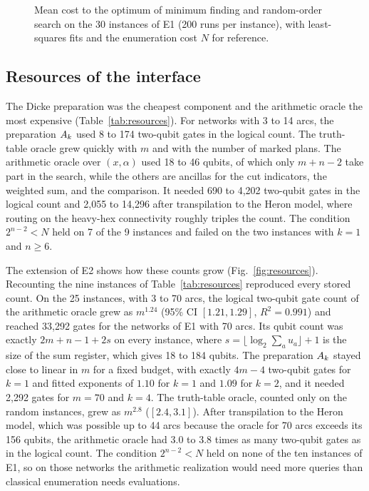 \begin{figure}[t]
\centering

\caption{Mean cost to the optimum of minimum finding and random-order search on the 30 instances of E1 (200 runs per instance), with least-squares fits and the enumeration cost $N$ for reference.}\label{fig:scaling}
\end{figure}

\subsection{Resources of the interface}\label{sec:results-resources}
The Dicke preparation was the cheapest component and the arithmetic oracle the most expensive (Table~\ref{tab:resources}). For networks with 3 to 14 arcs, the preparation $A_k$ used 8 to 174 two-qubit gates in the logical count. The truth-table oracle grew quickly with $m$ and with the number of marked plans. The arithmetic oracle over $(x,\alpha)$ used 18 to 46 qubits, of which only $m+n-2$ take part in the search, while the others are ancillas for the cut indicators, the weighted sum, and the comparison. It needed 690 to 4{,}202 two-qubit gates in the logical count and 2{,}055 to 14{,}296 after transpilation to the Heron model, where routing on the heavy-hex connectivity roughly triples the count. The condition $2^{n-2}<N$ held on 7 of the 9 instances and failed on the two instances with $k=1$ and $n\ge 6$.



The extension of E2 shows how these counts grow (Fig.~\ref{fig:resources}). Recounting the nine instances of Table~\ref{tab:resources} reproduced every stored count. On the 25 instances, with 3 to 70 arcs, the logical two-qubit gate count of the arithmetic oracle grew as $m^{1.24}$ (95\% CI $[1.21,1.29]$, $R^2=0.991$) and reached 33{,}292 gates for the networks of E1 with 70 arcs. Its qubit count was exactly $2m+n-1+2s$ on every instance, where $s=\lfloor\log_2\sum_a u_a\rfloor+1$ is the size of the sum register, which gives 18 to 184 qubits. The preparation $A_k$ stayed close to linear in $m$ for a fixed budget, with exactly $4m-4$ two-qubit gates for $k=1$ and fitted exponents of $1.10$ for $k=1$ and $1.09$ for $k=2$, and it needed 2{,}292 gates for $m=70$ and $k=4$. The truth-table oracle, counted only on the random instances, grew as $m^{2.8}$ ($[2.4,3.1]$). After transpilation to the Heron model, which was possible up to 44 arcs because the oracle for 70 arcs exceeds its 156 qubits, the arithmetic oracle had 3.0 to 3.8 times as many two-qubit gates as in the logical count. The condition $2^{n-2}<N$ held on none of the ten instances of E1, so on those networks the arithmetic realization would need more queries than classical enumeration needs evaluations.

